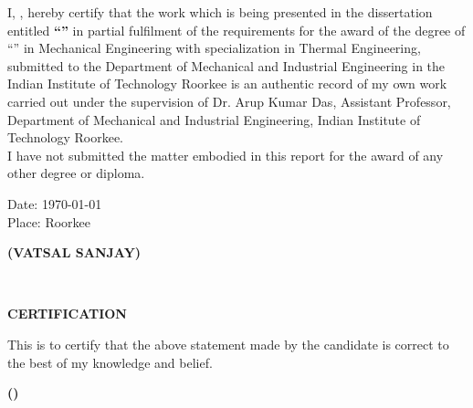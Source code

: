 \begin{declaration}
\noindent I, \authorname, hereby certify that the work which is being presented in the dissertation entitled {\bf\enquote{\ttitle}} in partial fulfilment of the requirements for the award of the degree of \enquote{\degreename} in Mechanical Engineering with specialization in Thermal Engineering, submitted to the Department of Mechanical and Industrial Engineering in the Indian Institute of Technology Roorkee is an  authentic record of my own work carried out under the supervision of Dr. Arup Kumar Das, Assistant Professor, Department of Mechanical and Industrial Engineering, Indian Institute of Technology Roorkee.\\
I have not submitted the matter embodied in this report for the award of any other degree or diploma.\\
\begin{minipage}{0.5\linewidth}\vspace{2.5cm}
\begin{flushleft}
Date: \today\\
Place: Roorkee
\end{flushleft}
\end{minipage}
\begin{minipage}{0.5\linewidth}\vspace{2.5cm}
\begin{flushright}
\textbf{(VATSAL SANJAY)}
\end{flushright} 
\end{minipage}\vspace{10mm}
\HRule\\
\begin{center}
{\large\bfseries{CERTIFICATION}\par}
\end{center}
This is to certify that the above statement made by the candidate is correct to the best of my knowledge and belief.\\
\begin{minipage}{0.5\linewidth}\vspace{2.5cm}
\hfill
\end{minipage}
\begin{minipage}{0.5\linewidth}\vspace{2.5cm}
\flushright
\textbf{(\supname)}
\end{minipage}
\end{declaration}
